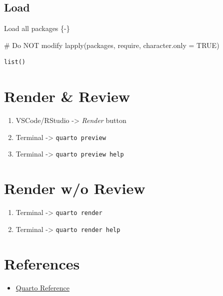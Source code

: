 \documentclass[
  letterpaper,
  DIV=11,
  numbers=noendperiod]{scrreprt}
\newenvironment{Shaded}{\begin{snugshade}}{\end{snugshade}}
\newcommand{\AttributeTok}[1]{\textcolor[rgb]{0.40,0.45,0.13}{#1}}
\newcommand{\CommentTok}[1]{\textcolor[rgb]{0.37,0.37,0.37}{#1}}
\newcommand{\ConstantTok}[1]{\textcolor[rgb]{0.56,0.35,0.01}{#1}}
\newcommand{\FunctionTok}[1]{\textcolor[rgb]{0.28,0.35,0.67}{#1}}
\newcommand{\NormalTok}[1]{\textcolor[rgb]{0.00,0.23,0.31}{#1}}
\providecommand{\tightlist}{%
  \setlength{\itemsep}{0pt}\setlength{\parskip}{0pt}}\usepackage{longtable,booktabs,array}
\begin{document}
\subsection{Load}\label{load-1}

Load all packages \{-\}

\begin{Shaded}
\begin{Highlighting}[]
\CommentTok{\# Do NOT modify}
\FunctionTok{lapply}\NormalTok{(packages, require, }\AttributeTok{character.only =} \ConstantTok{TRUE}\NormalTok{)}
\end{Highlighting}
\end{Shaded}

\begin{verbatim}
list()
\end{verbatim}

\section{Render \& Review}\label{render-review}

\begin{enumerate}
\def\labelenumi{\arabic{enumi}.}
\tightlist
\item
  VSCode/RStudio -\textgreater{} \emph{Render} button
\item
  Terminal -\textgreater{} \texttt{quarto\ preview}
\item
  Terminal -\textgreater{} \texttt{quarto\ preview\ help}
\end{enumerate}

\section{Render w/o Review}\label{render-wo-review}

\begin{enumerate}
\def\labelenumi{\arabic{enumi}.}
\tightlist
\item
  Terminal -\textgreater{} \texttt{quarto\ render}
\item
  Terminal -\textgreater{} \texttt{quarto\ render\ help}
\end{enumerate}

\section{References}\label{references-1}

\begin{itemize}
\tightlist
\item
  \href{https://quarto.org/docs/reference/}{Quarto Reference}
\end{itemize}
\end{document}
